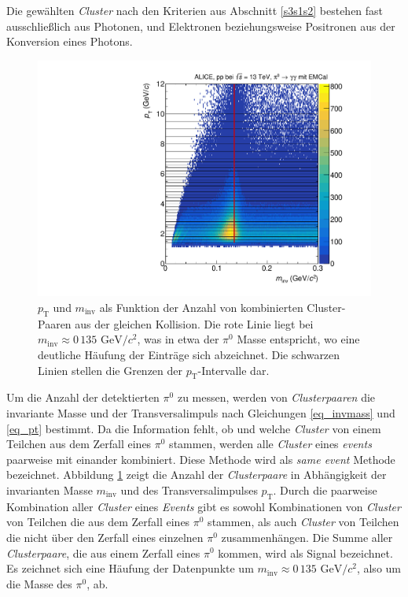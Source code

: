 Die gewählten \textit{Cluster} nach den Kriterien aus Abschnitt \ref{s3s1s2} bestehen fast ausschließlich aus Photonen, und  Elektronen beziehungsweise Positronen aus der Konversion eines Photons.
\begin{figure}[t!]
\centering
\includegraphics[width=.7\linewidth]{hInvMass_pT_Signal.pdf}
\caption{$p_\text{T}$ und $m_\text{inv}$ als Funktion der Anzahl von kombinierten  Cluster-Paaren aus der gleichen Kollision.
Die rote Linie liegt bei $m_{\text{inv}}\approx0\,135\text{ GeV/}c^{2}$, was in etwa der $\pi^{0}$ Masse entspricht, wo eine deutliche Häufung der Einträge sich abzeichnet.
Die schwarzen Linien stellen die Grenzen der $p_{\text{T}}$-Intervalle dar.}
\label{figInvMassPt_a}
\end{figure}
\newline
Um die Anzahl der detektierten $\pi^{0}$ zu messen, werden von \textit{Clusterpaaren} die invariante Masse und der Transversalimpuls nach Gleichungen \ref{eq_invmass} und \ref{eq_pt} bestimmt.
Da die Information fehlt, ob und welche \textit{Cluster} von einem Teilchen aus dem Zerfall eines $\pi^{0}$ stammen, werden alle \textit{Cluster} eines \textit{events} paarweise mit einander kombiniert.
Diese Methode wird als \textit{same event} Methode bezeichnet.
Abbildung \ref{figInvMassPt_a} zeigt die Anzahl der \textit{Clusterpaare} in Abhängigkeit der invarianten Masse $m_{\text{inv}}$ und des Transversalimpulses $p_{\text{T}}$.
Durch die paarweise Kombination aller \textit{Cluster} eines \textit{Events} gibt es sowohl Kombinationen von \textit{Cluster} von Teilchen die aus dem Zerfall eines $\pi^{0}$ stammen, als auch \textit{Cluster} von Teilchen die nicht über den Zerfall eines einzelnen $\pi^{0}$ zusammenhängen.
\newline
Die Summe aller \textit{Clusterpaare}, die aus einem Zerfall eines $\pi^{0}$ kommen, wird als Signal bezeichnet.
Es zeichnet sich eine Häufung der Datenpunkte um $m_{\text{inv}}\approx 0\,135\text{ GeV}/c^{2}$, also um die Masse des $\pi^{0}$, ab.
